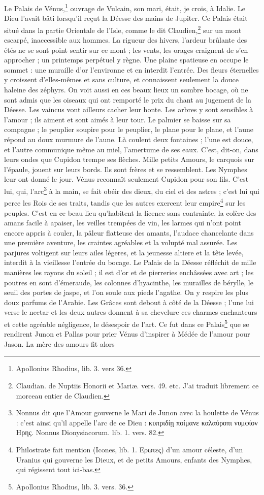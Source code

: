 \documentclass[a4paper, 11pt, oneside, polutonikogreek, french]{article}
\begin{document}
Le Palais de Vénus,\footnote{Apollonius Rhodius, lib. 3. vers 36.} ouvrage de Vulcain, son mari, était, je crois, à Idalie. Le Dieu l'avait bâti lorsqu'il reçut la Déesse des mains de Jupiter. Ce Palais était situé dans la partie Orientale de l'Isle, comme le dit Claudien,\footnote{Claudian. de Nuptiis Honorii et Mariæ. vers. 49. etc. J'ai traduit librement ce morceau entier de Claudien.} sur un mont escarpé, inaccessible aux hommes. La rigueur des hivers, l'ardeur brûlante des étés ne se sont point sentir sur ce mont ; les vents, les orages craignent de s'en approcher ; un printemps perpétuel y règne. Une plaine spatieuse en occupe le sommet : une muraille d'or l'environne et en interdit l'entrée. Des fleurs éternelles y croissent d'elles-mêmes et sans culture, et connaissent seulement la douce haleine des zéphyrs. On voit aussi en ces beaux lieux un sombre bocage, où ne sont admis que les oiseaux qui ont remporté le prix du chant au jugement de la Déesse. Les vaincus vont ailleurs cacher leur honte. Les arbres y sont sensibles à l'amour ; ils aiment et sont aimés à leur tour. Le palmier se baisse sur sa compagne ; le peuplier soupire pour le peuplier, le plane pour le plane, et l'aune répond au doux murmure de l'aune. Là coulent deux fontaines ; l'une est douce, et l'autre communique même au miel, l'amertume de ses eaux. C'est, dit-on, dans leurs ondes que Cupidon trempe ses flèches. Mille petits Amours, le carquois sur l'épaule, jouent sur leurs bords. Ils sont frères et se ressemblent. Les Nymphes leur ont donné le jour. Vénus reconnaît seulement Cupidon pour son fils. C'est lui, qui, l'arc\footnote{Nonnus dit que l'Amour gouverne le Mari de Junon avec la houlette de Vénus : c'est ainsi qu'il appelle l'arc de ce Dieu : κυπριδίῃ ποίμανε καλαύροπι νυμφίον Ηρης. Nonnus Dionysiacorum. lib. 1. vers. 82.} à la main, se fait obéir des dieux, du ciel et des astres ; c'est lui qui perce les Rois de ses traits, tandis que les autres exercent leur empire\footnote{Philostrate fait mention (Icones, lib. 1. Ερωτες) d'un amour céleste, d'un Uranius qui gouverne les Dieux, et de petits Amours, enfants des Nymphes, qui régissent tout ici-bas.} sur les peuples. C'est en ce beau lieu qu'habitent la licence sans contrainte, la colère des amans facile à apaiser, les veilles trempées de vin, les larmes qui n'ont point encore appris à couler, la pâleur flatteuse des amants, l'audace chancelante dans une première aventure, les craintes agréables et la volupté mal assurée. Les parjures voltigent sur leurs ailes légeres, et la jeunesse altiere et la tête levée, interdit à la vieillesse l'entrée du bocage. Le Palais de la Déesse réfléchit de mille manières les rayons du soleil ; il est d'or et de pierreries enchâssées avec art ; les poutres en sont d'émeraude, les colonnes d'hyacinthe, les murailles de bérylle, le seuil des portes de jaspe, et l'on soule aux pieds l'agathe. On y respire les plus doux parfums de l'Arabie. Les Grâces sont debout à côté de la Déesse ; l'une lui verse le nectar et les deux autres donnent à sa chevelure ces charmes enchanteurs et cette agréable négligence, le désespoir de l'art. Ce fut dans ce Palais\footnote{Apollonius Rhodius, lib. 3. vers. 36.} que se rendirent Junon et Pallas pour prier Vénus d'inspirer à Médée de l'amour pour Jason. La mère des amours fit alors 
\end{document}
